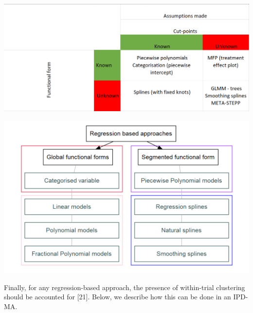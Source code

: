 \documentclass[14pt,]{article}
\begin{document}
\includegraphics[width=0.8\linewidth,height=0.8\textheight]{Figs/Assumption}

\includegraphics[width=0.8\linewidth,height=0.8\textheight]{Figs/TypesOfMethods}

Finally, for any regression-based approach, the presence of within-trial
clustering should be accounted for {[}21{]}. Below, we describe how this
can be done in an IPD-MA.
\end{document}
